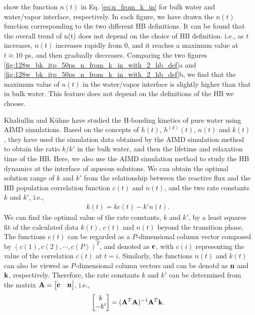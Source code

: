 {show the function $n(t)$ in Eq. \ref{eq:n_from_k_in} for bulk water and water/vapor interface, respectively. 
In each figure, we have drawn the $n(t)$ function corresponding to the two different HB definitions. 
It can be found that the overall trend of n(t) does not depend on the choice of HB definition.
i.e., as $t$ increases, $n(t)$ increases rapidly from 0, and it reaches a maximum value at $t \approx 10$ ps, and then gradually decreases. %
Comparing the two figures \ref{fig:128w_bk_itp_50ps_n_from_k_in_with_2_hb_def}a and \ref{fig:128w_bk_itp_50ps_n_from_k_in_with_2_hb_def}b,
we find that the maximum value of $n(t)$ in the water/vapor interface is slightly higher than that in bulk water. 
This feature does not depend on the definitions of the HB we choose.

Khaliullin and K\"uhne have studied the H-bonding kinetics of pure water using AIMD simulations. \cite{Khaliullin2013}
Based on the concepts of $h(t)$, $h^{(d)}(t)$, $n(t)$ and $k(t)$, they have used the simulation data 
obtained by the AIMD simulation method to obtain the ratio $k/k'$ in the bulk water, and then the lifetime and relaxation time 
of the HB.  Here, we also use the AIMD simulation method to study the HB dynamics at the interface of aqueous 
solutions. We can obtain the optimal solution range of $k$ and $k'$ from the relationship 
between the reactive flux and the HB population correlation function $c(t)$ and $n(t)$, and the two rate constants $k$ and $k'$, i.e.,
\begin{eqnarray}
  k(t) = kc(t)-k'n(t).
\label{eq:fitting_k_rates}
\end{eqnarray}
%
We can find the optimal value of the rate constants, $k$ and $k'$, 
by a least squares fit of the calculated data $k(t)$, $c(t)$ and $n(t)$ beyond the transition phase.  
The functions $c(t)$ can be regarded as a $P$-dimensional column vector composed by $(c(1),c(2),\cdots,c(P))^T$, and denoted as ${\bf c}$,
with $c(i)$ representing the value of the correlation $c(t)$ at $t=i$.
Similarly, the functions $n(t)$ and $k(t)$ can also be viewed as $P$-dimensional column vectors and can be denotd as ${\bf n}$ and ${\bf k}$, respectively.
Therefore, the rate constants $k$ and $k'$ can be determined from the matrix ${\bf A} = \begin{bmatrix} {\bf c} & {\bf n} \end{bmatrix}$, i.e., 
\begin{equation}
\begin{bmatrix} k\\ -k' \end{bmatrix} = ({\bf A}^T {\bf A})^{-1} {\bf A}^T {\bf k}. 

\end{equation}}
